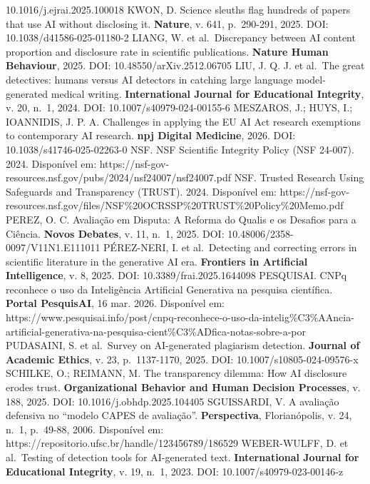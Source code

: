 \documentclass[
  12pt,
  a4paper,
  brazil
]{article}
\begin{document}
10.1016/j.ejrai.2025.100018 KWON, D. Science sleuths flag hundreds of
papers that use AI without disclosing it. \textbf{Nature}, v. 641,
p.~290-291, 2025. DOI: 10.1038/d41586-025-01180-2 LIANG, W. et
al.~Discrepancy between AI content proportion and disclosure rate in
scientific publications. \textbf{Nature Human Behaviour}, 2025. DOI:
10.48550/arXiv.2512.06705 LIU, J. Q. J. et al.~The great detectives:
humans versus AI detectors in catching large language model-generated
medical writing. \textbf{International Journal for Educational
Integrity}, v. 20, n.~1, 2024. DOI: 10.1007/s40979-024-00155-6 MESZAROS,
J.; HUYS, I.; IOANNIDIS, J. P. A. Challenges in applying the EU AI Act
research exemptions to contemporary AI research. \textbf{npj Digital
Medicine}, 2026. DOI: 10.1038/s41746-025-02263-0 NSF. NSF Scientific
Integrity Policy (NSF 24-007). 2024. Disponível em:
https://nsf-gov-resources.nsf.gov/pubs/2024/nsf24007/nsf24007.pdf NSF.
Trusted Research Using Safeguards and Transparency (TRUST). 2024.
Disponível em:
https://nsf-gov-resources.nsf.gov/files/NSF\%20OCRSSP\%20TRUST\%20Policy\%20Memo.pdf
PEREZ, O. C. Avaliação em Disputa: A Reforma do Qualis e os Desafios
para a Ciência. \textbf{Novos Debates}, v. 11, n.~1, 2025. DOI:
10.48006/2358-0097/V11N1.E111011 PÉREZ-NERI, I. et al.~Detecting and
correcting errors in scientific literature in the generative AI era.
\textbf{Frontiers in Artificial Intelligence}, v. 8, 2025. DOI:
10.3389/frai.2025.1644098 PESQUISAI. CNPq reconhece o uso da
Inteligência Artificial Generativa na pesquisa científica.
\textbf{Portal PesquisAI}, 16 mar. 2026. Disponível em:
https://www.pesquisai.info/post/cnpq-reconhece-o-uso-da-intelig\%C3\%AAncia-artificial-generativa-na-pesquisa-cient\%C3\%ADfica-notas-sobre-a-por
PUDASAINI, S. et al.~Survey on AI-generated plagiarism detection.
\textbf{Journal of Academic Ethics}, v. 23, p.~1137-1170, 2025. DOI:
10.1007/s10805-024-09576-x SCHILKE, O.; REIMANN, M. The transparency
dilemma: How AI disclosure erodes trust. \textbf{Organizational Behavior
and Human Decision Processes}, v. 188, 2025. DOI:
10.1016/j.obhdp.2025.104405 SGUISSARDI, V. A avaliação defensiva no
``modelo CAPES de avaliação''. \textbf{Perspectiva}, Florianópolis, v.
24, n.~1, p.~49-88, 2006. Disponível em:
https://repositorio.ufsc.br/handle/123456789/186529 WEBER-WULFF, D. et
al.~Testing of detection tools for AI-generated text.
\textbf{International Journal for Educational Integrity}, v. 19, n.~1,
2023. DOI: 10.1007/s40979-023-00146-z
\end{document}
